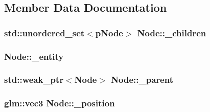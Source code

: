 \subsection{Member Data Documentation}
\subsubsection[{\texorpdfstring{\+\_\+children}{_children}}]{\setlength{\rightskip}{0pt plus 5cm}std\+::unordered\+\_\+set$<${\bf p\+Node}$>$ Node\+::\+\_\+children\hspace{0.3cm}{\ttfamily [private]}}\hypertarget{classNode_a6ee8ca308823ce214bfcb016f5bc7879}{}\label{classNode_a6ee8ca308823ce214bfcb016f5bc7879}
\subsubsection[{\texorpdfstring{\+\_\+entity}{_entity}}]{ Node\+::\+\_\+entity\hspace{0.3cm}{\ttfamily [private]}}\hypertarget{classNode_a3368ad7073fca05b90d0f38bfdea3cd5}{}\label{classNode_a3368ad7073fca05b90d0f38bfdea3cd5}
\subsubsection[{\texorpdfstring{\+\_\+parent}{_parent}}]{\setlength{\rightskip}{0pt plus 5cm}std\+::weak\+\_\+ptr$<${\bf Node}$>$ Node\+::\+\_\+parent\hspace{0.3cm}{\ttfamily [private]}}\hypertarget{classNode_a56087f97d2017476c226457a40140d20}{}\label{classNode_a56087f97d2017476c226457a40140d20}
\subsubsection[{\texorpdfstring{\+\_\+position}{_position}}]{\setlength{\rightskip}{0pt plus 5cm}glm\+::vec3 Node\+::\+\_\+position\hspace{0.3cm}{\ttfamily [private]}}\hypertarget{classNode_a69c878f3787faea652415b389977894d}{}\label{classNode_a69c878f3787faea652415b389977894d}
